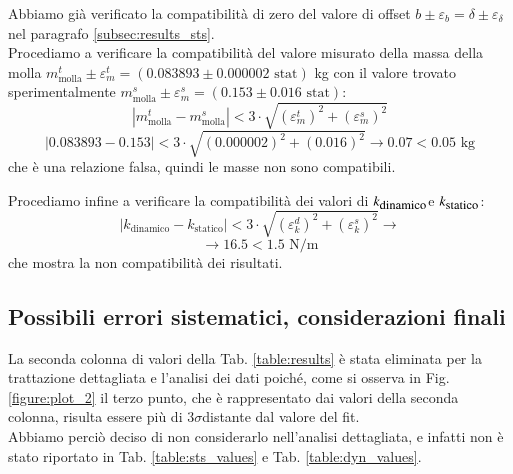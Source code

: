 \documentclass[italian, a4paper, 10pt, twocolumn]{../../style/lab_unige}
\newcommand{\reftab}[1]{Tab. {\ref{#1}}}%
\newcommand{\reffig}[1]{Fig. {\ref{#1}}}%
\newcommand{\ks}{$k_{\text{\small statico}}$\space}
\newcommand{\kd}{$k_{\text{\small dinamico}}$\space}
\newcommand{\treSigma}{$3\sigma$\space}
\begin{document}
{    Abbiamo già verificato la compatibilità di zero del valore di offset $b\pm\varepsilon_b =\delta\pm\varepsilon_{\delta}$
    nel paragrafo \ref{subsec:results_sts}.\\
    Procediamo a verificare la compatibilità del valore misurato della massa della molla 
    $m_{\text{molla}}^t\pm\varepsilon_m^t = (0.083893\pm0.000002\text{ stat})$ kg con il valore trovato sperimentalmente 
    $m_{\text{molla}}^s\pm\varepsilon_m^s = (0.153\pm0.016\text{ stat})$:
    \[
        \left|m_{\text{molla}}^t-m_{\text{molla}}^s\right|<3\cdot\sqrt{\left(\varepsilon_m^t\right)^2 + \left(\varepsilon_m^s\right)^2}
    \]
    \[
        \left|0.083893-0.153\right|<3\cdot\sqrt{\left(0.000002\right)^2 + \left(0.016\right)^2} \to 0.07<0.05\text{ kg}
    \]
    che è una relazione falsa, quindi le masse non sono compatibili.

    Procediamo infine a verificare la compatibilità dei valori di \kd e \ks:
    \[
        \left|k_{\text{dinamico}}-k_{\text{statico}}\right|<3\cdot\sqrt{\left(\varepsilon_k^d\right)^2 + \left(\varepsilon_k^s\right)^2} \to
    \]
    \[
        \to 16.5<1.5 \text{ N/m}
    \]
    che mostra la non compatibilità dei risultati.

    \subsection{Possibili errori sistematici, considerazioni finali}
    La seconda colonna di valori della \reftab{table:results} è stata eliminata per la trattazione dettagliata 
    e l'analisi dei dati poiché, come si osserva in \reffig{figure:plot_2} il terzo punto, che è rappresentato dai 
    valori della seconda colonna, risulta essere più di \treSigma distante dal valore del fit.\\
    Abbiamo perciò deciso di non considerarlo nell'analisi dettagliata, e infatti non è stato riportato in 
    \reftab{table:sts_values} e \reftab{table:dyn_values}.\\

}
\end{document}
